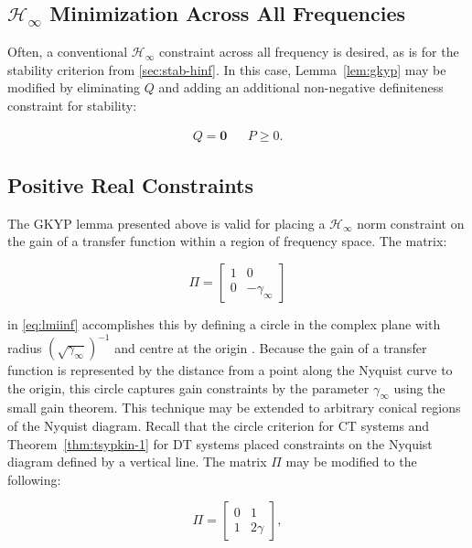 \subsection{$\mathcal{H}_\infty$ Minimization Across All Frequencies}
\label{sec:opt-hinf}

Often, a conventional $\mathcal{H}_\infty$ constraint across all frequency is desired, as is for the stability criterion from \autoref{sec:stab-hinf}. In this case, Lemma~\ref{lem:gkyp} may be modified by eliminating $Q$ and adding an additional non-negative definiteness constraint for stability:

\begin{align} \label{eq:gkyp-ifi}
	Q = \mathbf{0} &&
	P \geq 0.
\end{align}

\subsection{Positive Real Constraints}
\label{sec:opt-spr}

The \gls{GKYP} lemma presented above is valid for placing a $\mathcal{H}_\infty$ norm constraint on the gain of a transfer function within a region of frequency space. The matrix:

\begin{equation}
	\Pi = 
	\begin{bmatrix}
		1 & 0 \\
		0 & -\gamma_\infty
	\end{bmatrix} \label{eq:gkyp-sg}
\end{equation}

in \autoref{eq:lmiinf} accomplishes this by defining a circle in the complex plane with radius $\left(\sqrt{\gamma_\infty}\right)^{-1}$ and centre at the origin \cite[Lem. 1]{Iwasaki2003a}. Because the gain of a transfer function is represented by the distance from a point along the Nyquist curve to the origin, this circle captures gain constraints by the parameter $\gamma_\infty$ using the small gain theorem. This technique may be extended to arbitrary conical regions of the Nyquist diagram. Recall that the circle criterion for \gls{CT} systems and Theorem~\ref{thm:tsypkin-1} for \gls{DT} systems placed constraints on the Nyquist diagram defined by a vertical line. The matrix $\Pi$ may be modified to the following:

\begin{equation}
	\Pi = 
	\begin{bmatrix}
		0 & 1 \\
		1 & 2\gamma
	\end{bmatrix},
\end{equation}

